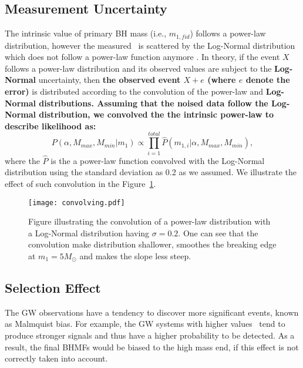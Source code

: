 \documentclass[twocolumn]{aastex62}
\newcommand{\blue}[1]{{#1}}
\begin{document}
\subsection{Measurement Uncertainty}\label{sec_likelihood_noise}
The intrinsic value of primary BH mass (i.e., $m_{1,fid}$) follows a power-law distribution, however the measured  \mone\ is scattered by the Log-Normal distribution which does not follow a power-law function anymore \citep{Koen2009}. In theory, if the event $X$ follows a power-law distribution and its observed values are subject to the {\bf Log-Normal} uncertainty, then {\bf the observed event $X + e$ (where $e$ denote the error)} is distributed according to the convolution of the power-law and {\bf Log-Normal distributions. Assuming that the noised data follow the Log-Normal distribution, we convolved the the intrinsic power-law to describe likelihood as:}
 \begin{equation} \label{equ_lik_conv}
 P(\alpha, M_{max}, M_{min}|m_{1}) \propto  \prod_{i=1}^{total} \hat{P}(m_{1,i}|\alpha, M_{max}, M_{min}),
 \end{equation}
where the $\hat{P}$ is the a power-law function convolved with the Log-Normal distribution using the standard deviation as 0.2 as we assumed. We illustrate the effect of such convolution in the Figure~\ref{fig:result_slope}.

\begin{figure}%
\texttt{[image: convolving.pdf]}
\caption{
Figure illustrating the convolution of a power-law distribution with a Log-Normal distribution having $\sigma = 0.2$. One can see that the convolution make distribution shallower, smoothes the breaking edge at $m_1 = 5 M_{\odot}$ and makes the slope less steep.
}
\label{fig:result_slope}
\end{figure}

\subsection{Selection Effect}\label{sec_likelihood_sf}
The GW observations have a tendency to discover more significant events, known as Malmquist bias. \blue{For example, the} GW systems with higher values \mone\ \blue{tend to} produce stronger signals and thus have a higher probability to be detected. \blue{As a result, the final BHMFs would be biased to the high mass end, if this effect is not correctly taken into account}.
\end{document}
